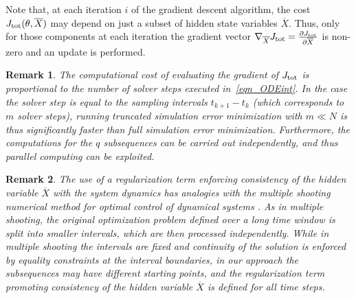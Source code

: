 \documentclass{article} %
\newtheorem{remark}{Remark}{\normalfont}{\normalfont}
\newcommand{\batchsize}{q}
\newcommand{\seqlen}{m}
\newcommand{\nsamp}{N}
\newcommand{\hidden}[1]{\overline{#1}}
\begin{document}
Note that, at each iteration $i$ of the gradient descent algorithm, the cost $J_{\rm tot}(\theta,\hidden{X})$ may depend on just a subset of hidden state variables $\hidden{X}$. %
Thus, only for those components at each iteration the gradient vector $\nabla_{\hidden{X}} J_{\rm tot}=\frac{\partial J_{\rm tot}}{\partial \hidden{X}}$ is non-zero and an update is performed.

\begin{remark}
The computational cost of evaluating  the gradient of $J_{\rm tot}$ is proportional to the number of solver steps executed in~\eqref{eqn_ODEint}. In the case the solver step is equal to the sampling intervals $t_{k+1}-t_k$ (which corresponds to $\seqlen$ solver steps),    running truncated  simulation error minimization with $\seqlen \ll \nsamp$  is thus significantly faster than full simulation error minimization.  
Furthermore, the computations for the $\batchsize$ subsequences can be carried out independently, and thus  parallel computing can be exploited. %
\end{remark}
 
 \begin{remark}
The use of a regularization term enforcing consistency of the hidden variable $\hidden{X}$ with the system dynamics has analogies with the \emph{multiple shooting} numerical method for optimal control of dynamical systems \cite{bock1984multiple}. As in multiple shooting, the original optimization problem defined over a long time window is split into smaller intervals, which are then processed 
independently. While in multiple shooting the intervals are fixed and continuity of the solution is enforced by equality constraints at the interval boundaries, in our approach the subsequences may have different starting points, and the regularization term promoting consistency of the hidden variable $\hidden{X}$ is defined for all time steps.
\end{remark}
\end{document}
